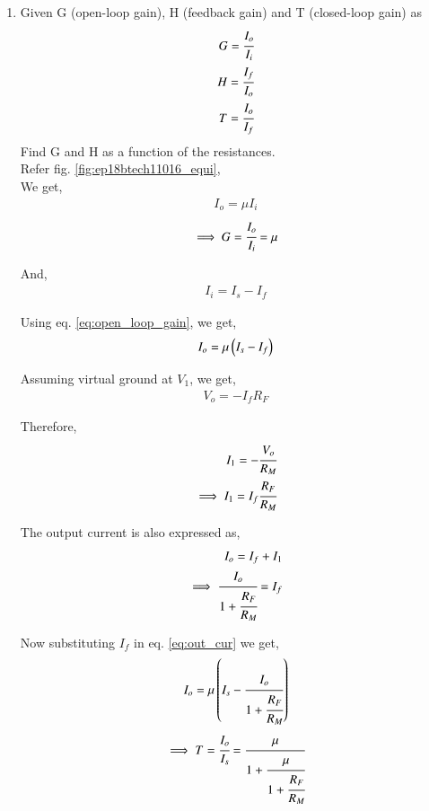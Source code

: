 \begin{enumerate}[label=\thesection.\arabic*.,ref=\thesection.\theenumi]
\item Given G (open-loop gain), H (feedback gain) and T (closed-loop gain) as
\begin{align}
    G = \cfrac{I_o}{I_i}\\
    H = \cfrac{I_f}{I_o}\\
    T = \cfrac{I_o}{I_f}
\end{align}
Find G and H as a function of the resistances.
\\
\solution Refer fig. \ref{fig:ep18btech11016_equi},\\
We get,
\begin{align}
    I_o = \mu I_i
\end{align}
\begin{align}
    \implies G = \cfrac{I_o}{I_i} = \mu
    \label{eq:open_loop_gain}
\end{align}

And,
\begin{align}
    I_i = I_s - I_f
\end{align}

Using eq. \ref{eq:open_loop_gain}, we get,
\begin{align}
    I_o = \mu \brak {I_s - I_f}
    \label{eq:out_cur}
\end{align}

Assuming virtual ground at $V_1$, we get,
\begin{align}
    V_o = - I_f R_F
\end{align}

Therefore,
\begin{align}
    I_1 = -\cfrac{V_o}{R_M}\\
    \implies I_1 = I_f \cfrac{R_F}{R_M}
\end{align}

The output current is also expressed as,
\begin{align}
    I_o = I_f + I_1\\
    \implies \cfrac{I_o}{1 + \cfrac{R_F}{R_M}} = I_f
\end{align}

Now substituting $I_f$ in  eq. \ref{eq:out_cur} we get,
\begin{align}
    I_o = \mu \left(I_s - \cfrac{I_o}{1 + \cfrac{R_F}{R_M}}\right)\\
\end{align}
\begin{align}
    \implies T = \cfrac{I_o}{I_s} = \cfrac{\mu}{1 + \cfrac{\mu}{1 + \cfrac{R_F}{R_M}}}
    \label{eq:closed_loop_gain}
\end{align}


\end{enumerate}
